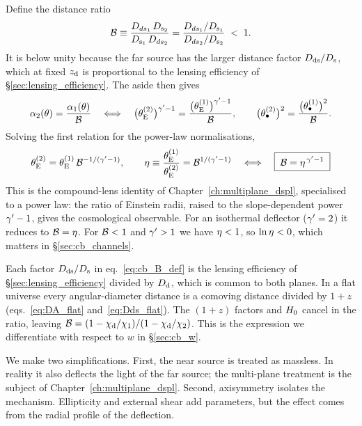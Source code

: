 Define the distance ratio
\begin{equation}
  \mathcal{B} \equiv
  \frac{D_{ds_1}\,D_{\mathrm{s}_2}}{D_{\mathrm{s}_1}\,D_{ds_2}}
  = \frac{D_{ds_1}/D_{\mathrm{s}_1}}{D_{ds_2}/D_{\mathrm{s}_2}}
  \;<\;1 .
  \label{eq:cb_B_def}
\end{equation}
It is below unity because the far source has the larger distance factor
$D_{\mathrm{ds}}/D_{\mathrm{s}}$, which at fixed $z_{\rm d}$ is proportional to the lensing
efficiency of \S\ref{sec:lensing_efficiency}. The aside then
gives
\begin{equation}
  \alpha_2(\theta) = \frac{\alpha_1(\theta)}{\mathcal{B}}
  \quad\Longleftrightarrow\quad
  \big(\theta_{\mathrm{E}}^{(2)}\big)^{\gamma'-1} = \frac{\big(\theta_{\mathrm{E}}^{(1)}\big)^{\gamma'-1}}{\mathcal{B}},
  \qquad
  \big(\theta_{\bullet}^{(2)}\big)^{2} = \frac{\big(\theta_{\bullet}^{(1)}\big)^{2}}{\mathcal{B}}.
  \label{eq:cb_alpha_scaling}
\end{equation}
Solving the first relation for the power-law normalisations,
\begin{equation}
  \theta_{\mathrm{E}}^{(2)} = \theta_{\mathrm{E}}^{(1)}\,\mathcal{B}^{-1/(\gamma'-1)},
  \qquad
  \eta \equiv \frac{\theta_{\mathrm{E}}^{(1)}}{\theta_{\mathrm{E}}^{(2)}} = \mathcal{B}^{1/(\gamma'-1)}
  \quad\Longleftrightarrow\quad
  \boxed{\;\mathcal{B} = \eta^{\,\gamma'-1}\;}
  \label{eq:cb_B_eta}
\end{equation}
This is the compound-lens identity of
Chapter~\ref{ch:multiplane_dspl}, specialised to a power law: the ratio
of Einstein radii, raised to the slope-dependent power $\gamma'-1$, gives
the cosmological observable. For an isothermal deflector ($\gamma'=2$) it
reduces to $\mathcal{B}=\eta$. For $\mathcal{B}<1$ and $\gamma'>1$ we have
$\eta<1$, so $\ln\eta<0$, which matters in
\S\ref{sec:cb_channels}. 

\begin{bridge}
Each factor $D_{\mathrm{ds}}/D_{\mathrm{s}}$ in eq.~\eqref{eq:cb_B_def} is the lensing
efficiency of \S\ref{sec:lensing_efficiency} divided by $D_{\mathrm{d}}$, which is
common to both planes. In a flat universe every
angular-diameter distance is a comoving distance divided by $1+z$
(eqs.~\eqref{eq:DA_flat} and~\eqref{eq:Dds_flat}). The $(1+z)$ factors
and $H_0$ cancel in the ratio, leaving
$\mathcal{B} = (1-\chi_{\mathrm{d}}/\chi_1)/(1-\chi_{\mathrm{d}}/\chi_2)$.
This is the expression we differentiate with respect to $w$ in
\S\ref{sec:cb_w}.
\end{bridge}

We make two simplifications. First, the near source is treated as
massless. In reality it also deflects the light of the far source; the
multi-plane treatment is the subject of
Chapter~\ref{ch:multiplane_dspl}. Second, axisymmetry isolates the
mechanism. Ellipticity and external shear add parameters, but the
effect comes from the radial profile of the deflection.


